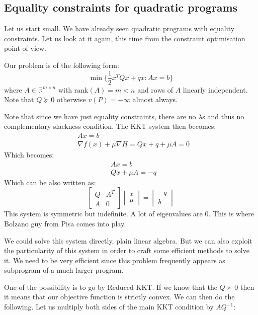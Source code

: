 \subsection{Equality constraints for quadratic programs}
\par Let us start small. We have already seen quadratic programs with equality constraints. Let us look at it again, this time from the constraint optimisation point of view.
\par Our problem is of the following form:
\begin{equation}
    \min\Big\{\frac{1}{2} x^T Q x + qx : Ax = b\Big\}
\end{equation}
where $A \in \mathbb{R}^{m \times n}$ with $\mbox{rank}(A) = m < n$ and rows of $A$ linearly independent. Note that $Q \succeq 0$ otherwise $v(P) = -\infty$ almost always.
\par Note that since we have just equality constraints, there are no $\lambda$s and thus no complementary slackness condition. The KKT system then becomes:
\begin{align}
    &Ax = b\\
    &\nabla f(x) + \mu \nabla H = Qx + q + \mu A = 0
\end{align}
Which becomes:
\begin{align}
    &Ax = b\\
    &Qx + \mu A = -q
\end{align}
Which can be also written as:
\begin{equation}
    \begin{bmatrix}
    Q & A^T \\
    A & 0
    \end{bmatrix}
    \begin{bmatrix}
    x\\
    \mu
    \end{bmatrix}
    =
    \begin{bmatrix}
    -q\\
    b
    \end{bmatrix}
\end{equation}
This system is symmetric but indefinite. A lot of eigenvalues are 0. This is where Bolzano guy from Pisa comes into play.
\par We could solve this system directly, plain linear algebra. But we can also exploit the particularity of this system in order to craft some efficient methods to solve it. We need to be very efficient since this problem frequently appears as subprogram of a much larger program.
\par One of the possibility is to go by Reduced KKT. If we know that the $Q \succ 0$ then it means that our objective function is strictly convex. We can then do the following. Let us multiply both sides of the main KKT condition by $AQ^{-1}$:
